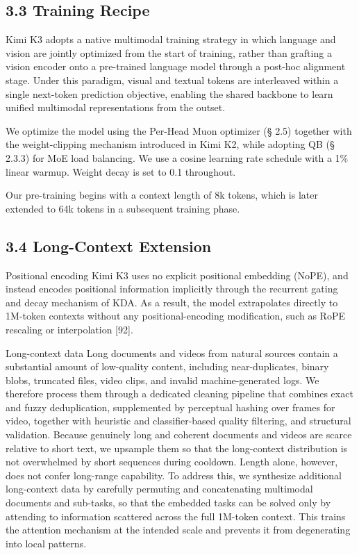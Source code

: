\documentclass[
  10
]{article}
\begin{document}
\subsection{3.3 Training Recipe}\label{training-recipe}

Kimi K3 adopts a native multimodal training strategy in which language
and vision are jointly optimized from the start of training, rather than
grafting a vision encoder onto a pre-trained language model through a
post-hoc alignment stage. Under this paradigm, visual and textual tokens
are interleaved within a single next-token prediction objective,
enabling the shared backbone to learn unified multimodal representations
from the outset.

We optimize the model using the Per-Head Muon optimizer (§ 2.5) together
with the weight-clipping mechanism introduced in Kimi K2, while adopting
QB (§ 2.3.3) for MoE load balancing. We use a cosine learning rate
schedule with a 1\% linear warmup. Weight decay is set to 0.1
throughout.

Our pre-training begins with a context length of 8k tokens, which is
later extended to 64k tokens in a subsequent training phase.

\subsection{3.4 Long-Context Extension}\label{long-context-extension}

Positional encoding Kimi K3 uses no explicit positional embedding
(NoPE), and instead encodes positional information implicitly through
the recurrent gating and decay mechanism of KDA. As a result, the model
extrapolates directly to 1M-token contexts without any
positional-encoding modification, such as RoPE rescaling or
interpolation {[}92{]}.

Long-context data Long documents and videos from natural sources contain
a substantial amount of low-quality content, including near-duplicates,
binary blobs, truncated files, video clips, and invalid
machine-generated logs. We therefore process them through a dedicated
cleaning pipeline that combines exact and fuzzy deduplication,
supplemented by perceptual hashing over frames for video, together with
heuristic and classifier-based quality filtering, and structural
validation. Because genuinely long and coherent documents and videos are
scarce relative to short text, we upsample them so that the long-context
distribution is not overwhelmed by short sequences during cooldown.
Length alone, however, does not confer long-range capability. To address
this, we synthesize additional long-context data by carefully permuting
and concatenating multimodal documents and sub-tasks, so that the
embedded tasks can be solved only by attending to information scattered
across the full 1M-token context. This trains the attention mechanism at
the intended scale and prevents it from degenerating into local
patterns.
\end{document}
